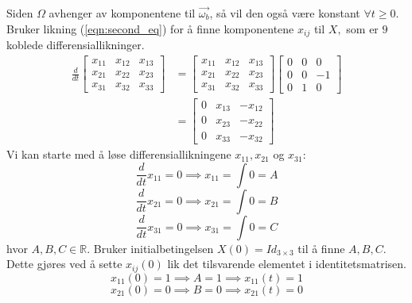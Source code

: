 Siden $\Omega$ avhenger av komponentene til $\vec{\omega_b}$, så vil den også være konstant $\forall t\geq 0.$ \newline\newline
Bruker likning (\ref{eqn:second_eq}) for å finne komponentene $x_{ij}$ til $X,$ som er $9$ koblede differensiallikninger.
\begin{equation}
\begin{aligned}
    \frac{d}{dt}\begin{bmatrix}x_{11}&x_{12}&x_{13}\\x_{21}&x_{22}&x_{23}\\x_{31}&x_{32}&x_{33}\end{bmatrix}&=\begin{bmatrix}x_{11}&x_{12}&x_{13}\\x_{21}&x_{22}&x_{23}\\x_{31}&x_{32}&x_{33}\end{bmatrix}\begin{bmatrix}0&0&0\\0&0&-1\\0&1&0\end{bmatrix}\\
    &=\begin{bmatrix}0&x_{13}&-x_{12}\\0&x_{23}&-x_{22}\\0&x_{33}&-x_{32}\end{bmatrix}
\end{aligned}
\end{equation}
Vi kan starte med å løse differensiallikningene $x_{11}, x_{21}$ og $x_{31}:$
\begin{equation}
    \frac{d}{dt}x_{11}=0\implies x_{11}=\int{0}=A
\end{equation}
\begin{equation}
    \frac{d}{dt}x_{21}=0\implies x_{21}=\int{0}=B
\end{equation}
\begin{equation}
    \frac{d}{dt}x_{31}=0\implies x_{31}=\int{0}=C
\end{equation}
hvor $A, B, C\in\mathbb{R}.$ Bruker initialbetingelsen $X(0)=Id_{3\times3}$ til å finne $A, B, C$. Dette gjøres ved å sette $x_{ij}(0)$ lik det tilsvarende elementet i identitetsmatrisen. 
\begin{equation}
    x_{11}(0)=1\implies A=1\implies x_{11}(t)=1
\end{equation}
\begin{equation}
    x_{21}(0)=0\implies B=0\implies x_{21}(t)=0
\end{equation}
